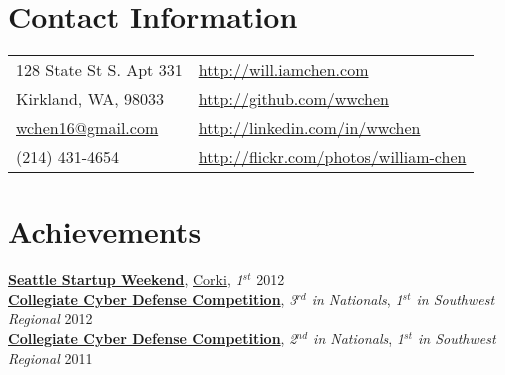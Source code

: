 \documentclass[margin,line]{res}
\begin{document}

\begin{resume}
\section{\sc Contact Information}
\begin{tabular}{@{}p{2.5in}p{4in}}
128 State St S. Apt 331                            & \href{http://will.iamchen.com}{http://will.iamchen.com} \\
Kirkland, WA, 98033                                & \href{http://github.com/wwchen}{http://github.com/wwchen} \\
\href{mailto:wchen16@gmail.com}{wchen16@gmail.com} & \href{http://linkedin.com/in/wwchen}{http://linkedin.com/in/wwchen} \\
(214) 431-4654                                     & \href{http://flickr.com/photos/william-chen}{http://flickr.com/photos/william-chen} \\
\end{tabular}

%
%
\section{\sc Achievements}
{\bf \href{http://seattle.startupweekend.org/}{Seattle Startup Weekend}}, \href{http://seattle.startupweekend.org/2012/11/26/seattle-startup-weekend-global-startup-battle-edition-winners-more/}{Corki},  {\em 1$^{st}$} \hfill 2012 \\
{\bf \href{http://www.nationalccdc.org/}{Collegiate Cyber Defense Competition}}, {\em 3$^{rd}$ in Nationals}, {\em 1$^{st}$ in Southwest Regional}  \hfill 2012 \\
{\bf \href{http://www.nationalccdc.org/}{Collegiate Cyber Defense Competition}}, {\em 2$^{nd}$ in Nationals}, {\em 1$^{st}$ in Southwest Regional}  \hfill 2011 \\
\vspace*{-5mm}


\end{resume}
\end{document}
